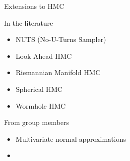 \documentclass{beamer}
\begin{document}
    \begin{frame}{Extensions to HMC}

    \begin{block}{In the literature}
        \begin{itemize}
            \item NUTS (No-U-Turns Sampler)
            \item Look Ahead HMC
            \item Riemannian Manifold HMC
            \item Spherical HMC
            \item Wormhole HMC
        \end{itemize}
    \end{block}

    \begin{block}{From group members}
        \begin{itemize}
            \item Multivariate normal approximations
            \item
        \end{itemize}
    \end{block}

    \end{frame}
\end{document}
